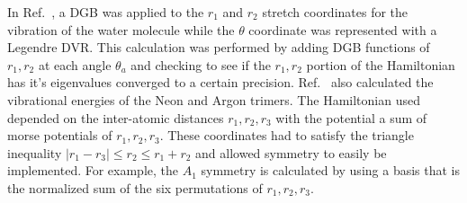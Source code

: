 In Ref.~,  a DGB was applied to the $r_1$ and $r_2$ stretch coordinates for the vibration of the water molecule while the $\theta$ coordinate was represented with a Legendre DVR.  This calculation was performed by adding DGB functions of $r_1,r_2$ at each angle $\theta_a$ and checking to see if the $r_1,r_2$ portion of the Hamiltonian has it's eigenvalues converged to a certain precision.   Ref.~ also calculated the vibrational energies of the Neon and Argon trimers.  The Hamiltonian used depended on the inter-atomic distances $r_1,r_2,r_3$ with the potential a sum of morse potentials of $r_1,r_2,r_3$.  These coordinates had to satisfy the triangle inequality $\left|r_1-r_3\right|\leq r_2 \leq r_1+r_2$ and allowed symmetry to easily be implemented.  For example, the $A_1$ symmetry is calculated by using a basis that is the normalized sum of the six permutations of $r_1,r_2,r_3$.


